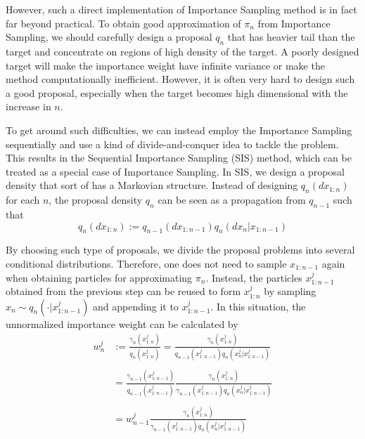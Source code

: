 \documentclass[12pt,a4paper]{article}
\begin{document}
However, such a direct implementation of Importance Sampling method is in fact far beyond practical. To obtain good approximation of $\pi_n$ from Importance Sampling, we should carefully design a proposal $q_n$ that has heavier tail than the target and concentrate on regions of high density of the target. A poorly designed target will make the importance weight have infinite variance or make the method computationally inefficient. However, it is often very hard to design such a good proposal, especially when the target becomes high dimensional with the increase in $n$. 

To get around such difficulties, we can instead employ the Importance Sampling sequentially and use a kind of divide-and-conquer idea to tackle the problem. This results in the Sequential Importance Sampling (SIS) method, which can be treated as a special case of Importance Sampling. In SIS, we design a proposal density that sort of has a Markovian structure. Instead of designing $q_n(dx_{1:n})$ for each $n$, the proposal density $q_n$ can be seen as a propagation from $q_{n-1}$ such that 
$$q_n(dx_{1:n}) := q_{n-1}(dx_{1:n-1})q_n(dx_n|x_{1:n-1})$$

By choosing such type of proposals, we divide the proposal problems into several conditional distributions. Therefore, one does not need to sample $x_{1:n-1}$ again when obtaining particles for approximating $\pi_n$. Instead, the particles $x_{1:n-1}^j$ obtained from the previous step can be reused to form $x_{1:n}^j$ by sampling $x_n \sim q_n\left(\cdot|x_{1:n-1}^j\right)$ and appending it to $x_{1:n-1}^j$. In this situation, the unnormalized importance weight can be calculated by 
\begin{equation}
    \label{SIS-Unnormalzied Weight}
\begin{split}
    w_{n}^j &:= \frac{\gamma_n\left(x_{1:n}^j\right)}{q_n\left(x_{1:n}^j\right)} = \frac{\gamma_n\left(x_{1:n}^j\right)}{q_{n-1}\left(x_{1:n-1}^j\right)q_n\left(x_n^j|x_{1:n-1}^j\right)} \\\\
    &=\frac{\gamma_{n-1}\left(x_{1:n-1}^j\right)}{q_{n-1}\left(x_{1:n-1}^j\right)} \frac{\gamma_{n}\left(x_{1:n}^j\right)}{\gamma_{n-1}\left(x_{1:n-1}^j\right) q_n\left(x_n^j|x_{1:n-1}^j\right)}\\\\
    &= w_{n-1}^j \frac{\gamma_{n}\left(x_{1:n}^j\right)}{\gamma_{n-1}\left(x_{1:n-1}^j\right) q_n\left(x_n^j|x_{1:n-1}^j\right)}
\end{split}
\end{equation}
\end{document}
